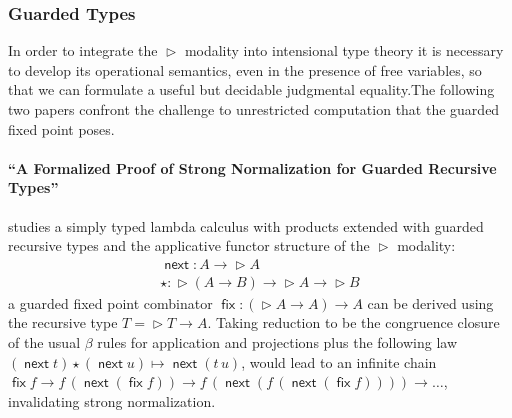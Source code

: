 \documentclass{book}
\DeclareMathOperator{\fix}{\mathsf{fix}}
\newcommand{\red}{\to}
\DeclareMathOperator{\Later}{\vartriangleright}
\DeclareMathOperator{\next}{\ensuremath{\mathsf{next}}}
\begin{document}




\subsubsection{Guarded Types}
  
In order to integrate the $\Later$ modality into intensional type
theory it is necessary to develop its operational semantics, even in
the presence of free variables, so that we can formulate a useful but
decidable judgmental equality.The following two papers confront the
challenge to unrestricted computation that the guarded fixed point
poses.

  \paragraph{``A Formalized Proof of Strong Normalization for Guarded Recursive Types''}
  studies a simply typed lambda calculus with products extended with guarded
  recursive types and the applicative functor structure of the $\Later$
  modality:
  \[
  \begin{array}{l}
  \next : A \to \Later A \\
  \star : \Later (A \to B) \to \Later A \to \Later B
  \end{array}
  \]
  a guarded fixed point combinator $\fix : (\Later A \to A) \to
  A$ can be derived using the recursive type $T = \Later T \to A$.  
  Taking reduction to be the congruence closure of the usual $\beta$ rules
  for application and projections plus the following law $(\next t)
  \star (\next u) \mapsto \next (t\,u)$, would lead to an infinite
  chain $\fix f \red f\,(\next (\fix f)) \red f\,(\next (f\,(\next (\fix f)))) \red
  \ldots$, invalidating strong normalization.
  
\end{document}
